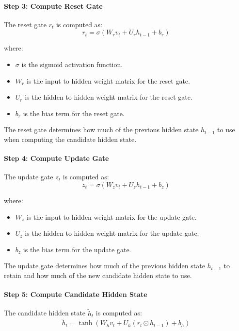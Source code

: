 \documentclass[12pt,a4paper]{article}
\begin{document}
\paragraph{Step 3: Compute Reset Gate}
The reset gate $r_t$ is computed as:
\begin{equation}
    r_t = \sigma(W_r v_t + U_r h_{t-1} + b_r)
\end{equation}

where:
\begin{itemize}
    \item $\sigma$ is the sigmoid activation function.
    \item $W_r$ is the input to hidden weight matrix for the reset gate.
    \item $U_r$ is the hidden to hidden weight matrix for the reset gate.
    \item $b_r$ is the bias term for the reset gate.
\end{itemize}
The reset gate determines how much of the previous hidden state $h_{t-1}$ to use when computing the candidate hidden state.

\paragraph{Step 4: Compute Update Gate}
The update gate $z_t$ is computed as:
\begin{equation}
    z_t = \sigma(W_z v_t + U_z h_{t-1} + b_z)
\end{equation}

where:
\begin{itemize}
    \item $W_z$ is the input to hidden weight matrix for the update gate.
    \item $U_z$ is the hidden to hidden weight matrix for the update gate.
    \item $b_z$ is the bias term for the update gate.
\end{itemize}
The update gate determines how much of the previous hidden state $h_{t-1}$ to retain and how much of the new candidate hidden state to use.

\paragraph{Step 5: Compute Candidate Hidden State}
The candidate hidden state $\tilde{h}_t$ is computed as:
\begin{equation}
    \tilde{h}_t = \tanh(W_h v_t + U_h (r_t \odot h_{t-1}) + b_h)    
\end{equation}
\end{document}
